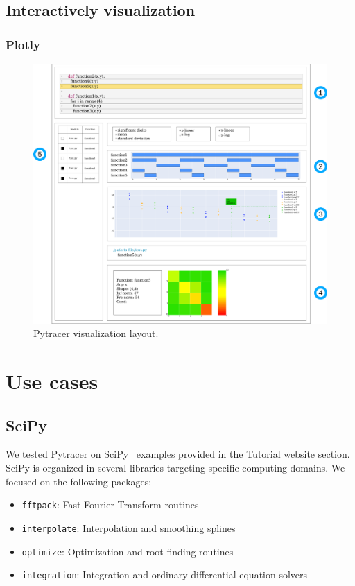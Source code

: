\documentclass[11pt]{article}
\begin{document}
\subsection{Interactively visualization}

\subsubsection{Plotly}

\begin{figure}
    \centering
    \includegraphics[width=\linewidth]{figure/pytracer_layout.pdf}
    \caption{Pytracer visualization layout.}
    \label{fig:my_label}
\end{figure}



\section{Use cases}

\subsection{SciPy}

We tested Pytracer on SciPy~\cite{virtanen2020scipy} examples provided in the Tutorial website section.
SciPy is organized in several libraries targeting specific computing domains.
We focused on the following packages:
\begin{itemize}
    \item \texttt{fftpack}: Fast Fourier Transform routines
    \item \texttt{interpolate}: Interpolation and smoothing splines
    \item \texttt{optimize}: Optimization and root-finding routines
    \item \texttt{integration}: Integration and ordinary differential equation solvers
\end{itemize}
\end{document}
